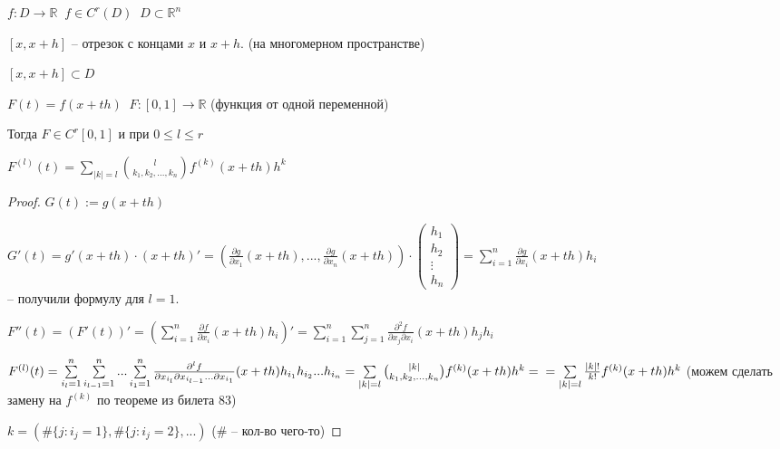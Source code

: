 \begin{lemma} \thmslashn

$f: D \to \mathbb{R} \;\; f\in C^r(D) \;\; D \subset \mathbb{R}^n$

$[x, x+h]$ -- отрезок с концами $x$ и $x+h$. (на многомерном пространстве)

$[x, x+h] \subset D$

$F(t) = f(x+th) \;\; F:[0,1] \to \mathbb{R}$ (функция от одной переменной)

Тогда $F\in C^r[0,1]$ и при $0\le l \le r$

$F^{(l)}(t) = \sum\limits_{|k| = l} \binom{l}{k_1, k_2,...,k_n}f^{(k)} (x+th) h^k$

\begin{proof} \thmslashn

$G(t) := g(x+th)$

$G'(t) = g'(x+th)\cdot(x+th)' = (\frac{\partial g}{\partial x_1}(x+th), ..., \frac{\partial g}{\partial x_n}(x+th))\cdot \begin{pmatrix}
h_1\\h_2\\\vdots\\h_n
\end{pmatrix} = 
\sum\limits_{i = 1}^{n} \frac{\partial g}{\partial x_i}(x+th) h_i$\\ -- получили формулу для $l = 1$.

$F''(t) = (F'(t))' = (\sum\limits_{i = 1}^{n} \frac{\partial f}{\partial x_i}(x+th) h_i)' = \sum\limits_{i = 1}^{n}\sum\limits_{j = 1}^{n} \frac{\partial^2 f}{\partial x_j \partial x_i}(x+th) h_jh_i$

$F^{(l)} (t) = \sum\limits_{i_{l} = 1}^{n}\sum\limits_{i_{l-1} = 1}^{n}...\sum\limits_{i_1 = 1}^{n} \frac{\partial^l f}{\partial x_{i_l} \partial x_{i_{l-1}}...\partial x_{i_1}} (x+th)h_{i_1}h_{i_2}...h_{i_n} = \sum\limits_{|k| = l} \binom{|k|}{k_1,k_2,...,k_n}f^{(k)}(x+th)h^k =\\= \sum\limits_{|k| = l} \frac{|k|!}{k!}f^{(k)}(x+th)h^k$ (можем сделать замену на $f^{(k)}$ по теореме из билета 83)

$k = (\#\{j: i_j = 1\}, \#\{j: i_j = 2 \},...)$ \quad ($\#$ -- кол-во чего-то)

\end{proof}
\end{lemma}